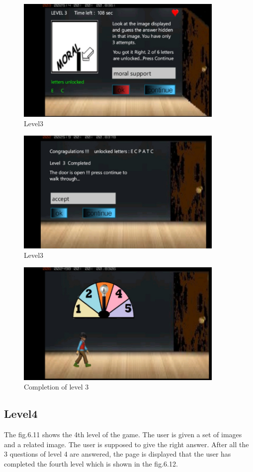 \begin{figure}[htbp]
	\centering
	\includegraphics[width=10cm,height=6cm]{8.jpg}
	\caption{Level3}
\end{figure}
\begin{figure}[htbp]
	\centering
	\includegraphics[width=10cm,height=6cm]{9.jpg}
	\caption{Level3}
\end{figure}
\begin{figure}[htbp]
	\centering
	\includegraphics[width=10cm,height=6cm]{10.jpg}
	\caption{Completion of level 3}
\end{figure}

\vspace{6cm}

\subsection{Level4}
\hspace{1cm}The fig.6.11 shows the 4th level of the game. The user is given a set of images and a related image. The user is supposed to give the right answer. After all the 3 questions of level 4 are answered, the page is displayed that the user  has completed the fourth level which is shown in the fig.6.12.


